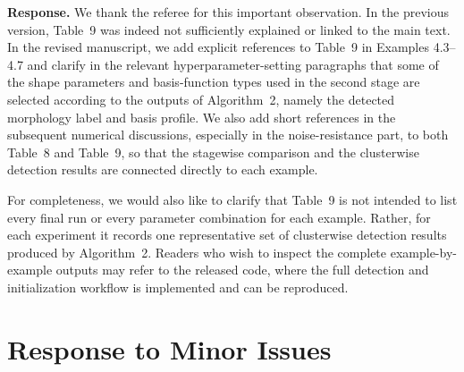\documentclass[11pt]{article}
\newcommand{\response}[1]{\vspace{0.2em}\noindent\textbf{Response.} #1}
\begin{document}
\response{We thank the referee for this important observation. In the previous version, Table~9 was indeed not sufficiently explained or linked to the main text. In the revised manuscript, we add explicit references to Table~9 in Examples 4.3--4.7 and clarify in the relevant hyperparameter-setting paragraphs that some of the shape parameters and basis-function types used in the second stage are selected according to the outputs of Algorithm~2, namely the detected morphology label and basis profile. We also add short references in the subsequent numerical discussions, especially in the noise-resistance part, to both Table~8 and Table~9, so that the stagewise comparison and the clusterwise detection results are connected directly to each example.

For completeness, we would also like to clarify that Table~9 is not intended to list every final run or every parameter combination for each example. Rather, for each experiment it records one representative set of clusterwise detection results produced by Algorithm~2. Readers who wish to inspect the complete example-by-example outputs may refer to the released code, where the full detection and initialization workflow is implemented and can be reproduced.}
\section*{Response to Minor Issues}
\end{document}
